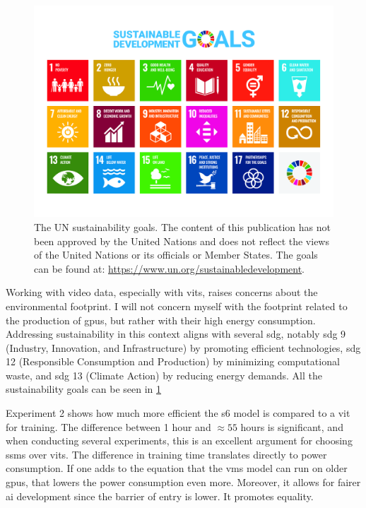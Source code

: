 \begin{figure}
    \centering
    \includegraphics[width=1\linewidth]{figures/un_poster.jpg}
    \caption{The UN sustainability goals. The content of this publication has not been approved by the United Nations and does not reflect the views of the United Nations or its officials or Member States. The goals can be found at: \url{https://www.un.org/sustainabledevelopment}.}
    \label{fig:sdg}
\end{figure}

Working with video data, especially with \acrshort{vit}s, raises concerns about the environmental footprint. I will not concern myself with the footprint related to the production of \acrshort{gpu}s, but rather with their high energy consumption. Addressing sustainability in this context aligns with several \acrfull{sdg}, notably \acrshort{sdg} 9 (Industry, Innovation, and Infrastructure) by promoting efficient technologies, \acrshort{sdg} 12 (Responsible Consumption and Production) by minimizing computational waste, and \acrshort{sdg} 13 (Climate Action) by reducing energy demands. All the sustainability goals can be seen in \cref{fig:sdg}

Experiment 2 shows how much more efficient the \acrshort{s6} model is compared to a \acrshort{vit} for training. The difference between 1 hour and $\approx55$ hours is significant, and when conducting several experiments, this is an excellent argument for choosing \acrshort{ssm}s over \acrshort{vit}s. The difference in training time translates directly to power consumption. If one adds to the equation that the \acrshort{vms} model can run on older \acrshort{gpu}s, that lowers the power consumption even more. Moreover, it allows for fairer \acrfull{ai} development since the barrier of entry is lower. It promotes equality. 

